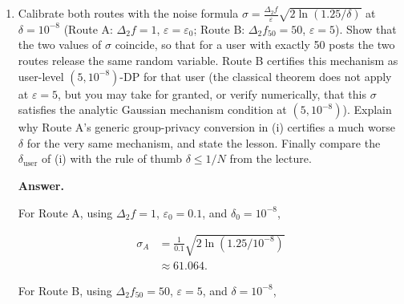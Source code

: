 \documentclass[11pt]{article}
\newcommand{\eps}{\varepsilon}
\newcommand{\user}{\mathrm{user}}
\newenvironment{answer}{\par\medskip\noindent\textbf{Answer.}\ }{\par\bigskip}
\begin{document}
\begin{enumerate}
\begin{enumerate}
\begin{answer}
By the group-privacy theorem for approximate
DP, a group of size $k$ has privacy parameters

\[
\eps_{\mathrm{user}}=k\eps_0,
\qquad
\delta_{\mathrm{user}}
=\delta_0\sum_{i=0}^{k-1}e^{i\eps_0}.
\]

For a user with $k=50$ posts,

\[
\eps_{\mathrm{user}}=50(0.1)=5,
\]

and

\[
\begin{aligned}
\delta_{\mathrm{user}}
&=10^{-8}\sum_{i=0}^{49}e^{0.1i}\\
&=10^{-8}\frac{e^5-1}{e^{0.1}-1}\\
&\approx 1.402\times10^{-5}.
\end{aligned}
\]

Therefore, Route A provides the guarantee

\[
\boxed{(5,\ 1.402\times10^{-5})\text{-DP}}
\]

for a user with exactly $50$ posts.

\end{answer}

\item Calibrate both routes with the noise formula
$\sigma=\frac{\Delta_2 f}{\eps}\sqrt{2\ln(1.25/\delta)}$ at
$\delta=10^{-8}$ (Route A: $\Delta_2 f=1$, $\eps=\eps_0$; Route B:
$\Delta_2 f_{50}=50$, $\eps=5$). Show that the two values of $\sigma$
coincide, so that for a user with exactly 50 posts the two routes release
the same random variable. Route B certifies this mechanism as user-level
$(5,10^{-8})$-DP for that user (the classical theorem does not apply at
$\eps=5$, but you may take for granted, or verify numerically, that this
$\sigma$ satisfies the analytic Gaussian mechanism condition at
$(5,10^{-8})$). Explain why Route A's generic group-privacy conversion in
(i) certifies a much worse $\delta$ for the very same mechanism, and state
the lesson. Finally compare the $\delta_{\user}$ of (i) with the rule of
thumb $\delta\le1/N$ from the lecture.

\begin{answer}

For Route A, using $\Delta_2 f=1$,
$\eps_0=0.1$, and $\delta_0=10^{-8}$,

\[
\begin{aligned}
\sigma_A
&=\frac{1}{0.1}
\sqrt{2\ln(1.25/10^{-8})}\\
&\approx61.064.
\end{aligned}
\]

For Route B, using $\Delta_2 f_{50}=50$,
$\eps=5$, and $\delta=10^{-8}$,


\end{answer}
\end{enumerate}
\end{enumerate}
\end{document}
